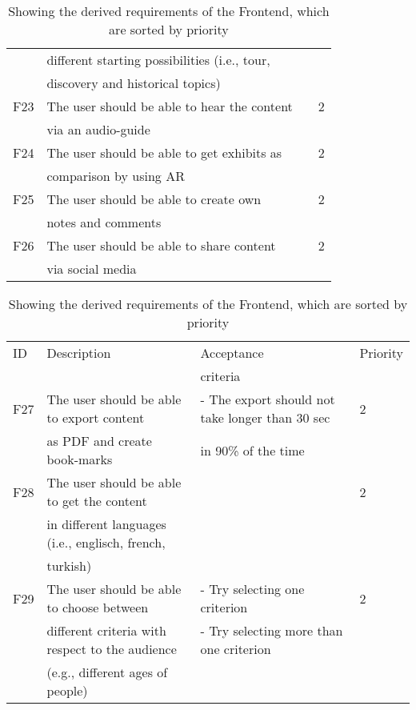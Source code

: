 \begin{table}[h]
\begin{tabular}{llll}
	& different starting possibilities (i.e., tour, &	& \\
	& discovery and historical topics) 		&	& \\
\hline
F23 & The user should be able to hear the content &  & 2\\
	& via an audio-guide				&	& \\
\hline
F24 & The user should be able to get exhibits as &  & 2\\
	& comparison by using AR			&	& \\ 
\hline
F25 & The user should be able to create own &  & 2\\
	& notes and comments				&	& \\
\hline
F26 & The user should be able to share content &  & 2\\
	& via social media					&		& \\
	\bottomrule
\end{tabular}
\caption{Showing the derived requirements of the Frontend, which are sorted by priority}
\label{RequirementsFrontend2}
\end{table}

\begin{table}[h]
\centering%
\begin{tabular}{llll}
	\toprule
ID 	& Description 	& Acceptance 	& Priority \\
 	& 			 & criteria 	&  \\
\cmidrule(rl){1-1}\cmidrule(rl){2-2}\cmidrule(rl){3-3}\cmidrule(rl){4-4}
F27 & The user should be able to export content & - The export should not take longer than 30 sec & 2\\
	& as PDF and create book-marks			& in 90\% of the time	& \\
\hline
F28 & The user should be able to get the content &  & 2\\
	& in different languages (i.e., englisch, french, &	& \\
	& turkish) &	& \\
\hline
F29 & The user should be able to choose between  & - Try selecting one criterion & 2\\
	& different criteria with respect to the audience & - Try selecting more than one criterion	& \\
	& (e.g., different ages of people) &	& \\
	\bottomrule
\end{tabular}
\caption{Showing the derived requirements of the Frontend, which are sorted by priority}
\label{RequirementsFrontend3}
\end{table}
